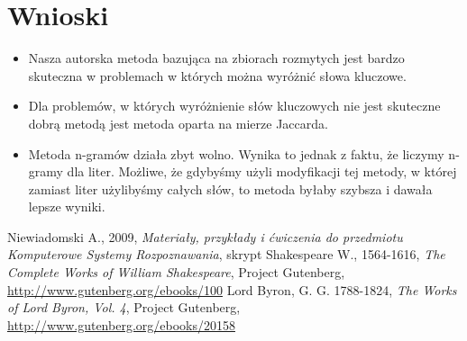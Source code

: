 \documentclass[a4paper]{classrep}
\begin{document}
\section{Wnioski}
\begin{itemize}
\item Nasza autorska metoda bazująca na zbiorach rozmytych jest bardzo skuteczna w problemach w których można wyróżnić słowa kluczowe.
\item Dla problemów, w których wyróżnienie słów kluczowych nie jest skuteczne dobrą metodą jest metoda oparta na mierze Jaccarda.
\item Metoda n-gramów działa zbyt wolno. Wynika to jednak z faktu, że liczymy n-gramy dla liter. Możliwe, że gdybyśmy użyli modyfikacji tej metody, w której zamiast
liter użylibyśmy całych słów, to metoda byłaby szybsza i dawała lepsze wyniki.
\end{itemize}


\begin{thebibliography}{2}
 Niewiadomski A., 2009, \textit{Materiały, przykłady i ćwiczenia do przedmiotu Komputerowe Systemy Rozpoznawania}, skrypt
 Shakespeare W., 1564-1616, \textit{The Complete Works of William Shakespeare}, Project Gutenberg, \url{http://www.gutenberg.org/ebooks/100}
 Lord Byron, G. G. 1788-1824, \textit{The Works of Lord Byron, Vol. 4}, Project Gutenberg, \url{http://www.gutenberg.org/ebooks/20158}
\end{thebibliography}
\end{document}
